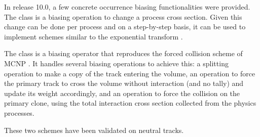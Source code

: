 In release 10.0, a few concrete occurrence biasing functionalities were provided.
The class  is a biasing operation to change a
process cross section.  Given this change can be done per process and on a 
step-by-step basis, it can be used to implement schemes similar to the 
exponential transform \cite{bib:exptran}.

The class  is a biasing operator that reproduces
the forced collision scheme of MCNP \cite{bib:MCNP}.  It handles several 
biasing operations to achieve this: a splitting operation to make a copy of the
track entering the volume, an operation to force the primary track to cross the
volume without interaction (and no tally) and update its weight accordingly, 
and an operation to force the collision on the primary clone, using the total 
interaction cross section collected from the physics processes.

These two schemes have been validated on neutral tracks.

